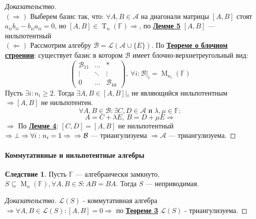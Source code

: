 \documentclass[a4paper, 14pt]{extarticle}
\theoremstyle{definition}
\newtheorem{conseq}{Следствие}
\begin{document}
\begin{proof}[Доказательство]
	~\\
	\((\Rightarrow)\) Выберем базис так, что: \(\forall A, B \in \mathcal{A}\) на диагонали матрицы \([A, B]\) стоят \(a_{ii}b_{ii} - b_{ii}a_{ii} = 0\), но \([A, B] \in \operatorname{T}_n(\mathbb{F}) \Rightarrow\), по \hyperref[lm4_2]{\textbf{Лемме 5}} \([A, B]\) --- нильпотентный\\
	\((\Leftarrow)\) Рассмотрим алгебру \(\mathcal{B} = \mathcal{L}(\mathcal{A} \cup \{E\})\). По \hyperref[th3_1]{\textbf{Теореме о блочном строении}}: существует базис в котором \(\mathcal{B}\) имеет блочно-верхнетреугольный вид:
	\[\left(
		\begin{array}{ccc}
			\mathcal{B}_{11} & \hdots & * \\
			\vdots & \ddots & \vdots \\ 
			0 & \hdots & \mathcal{B}_{kk}
		\end{array}
	\right),\ \forall i : \mathcal{B}|_i = \operatorname{M}_{n_i}(\mathbb{F})\]
	Пусть \(\exists i : n_i \geqslant 2.\) Тогда \(\exists A, B \in [A, B]\left|_i\right.\) не являющийся нильпотентным \(\Rightarrow [A, B]\) не нильпотентен.
	\[\forall A, B \in \mathcal{B}: \exists C, D \in \mathcal{A} \text{ и } \lambda, \mu \in \mathbb{F} : \]
	\[A = C + \lambda E,\ B = D + \mu E \Rightarrow \]
	\(\Rightarrow\) По \hyperref[lm4_1]{\textbf{Лемме 4}}: \([C, D] = [A, B]\) не нильпотентный \(\Rightarrow \bot \Rightarrow \forall i : n_i = 1 \Rightarrow \\ \Rightarrow \mathcal{B}\) --- триангулизуема \(\Rightarrow \mathcal{A}\) --- триангулизуема.
\end{proof}

\paragraph{Коммутативные и нильпотентные алгебры}

\begin{conseq}
	Пусть \(\mathbb{F}\) --- алгебраически замкнуто, \(S \subseteq \operatorname{M}_n(\mathbb{F}), \forall A, B \in S : AB = BA\). Тогда \(S\) --- неприводимая.
\end{conseq}

\begin{proof}[Доказательство]
	\(\mathcal{L}(S)\) - коммутативная алгебра \(\Rightarrow \forall A, B \in \mathcal{L}(S) : [A, B] = 0 \Rightarrow \) по \hyperref[th4_1]{\textbf{Теореме 3}} \(\mathcal{L}(S)\) - триангулизуема.
\end{proof}
\end{document}
